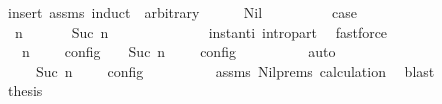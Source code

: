 \begin{isabellebody}
\ {\isacharparenleft}insert\ assms{\isacharcomma}\ induct\ {\isasymPsi}\ arbitrary{\isacharcolon}\ {\isasymGamma}\ {\isasymPhi}{\isacharparenright}\isanewline
\ \ \isamarkupfalse%
\ {\isacharparenleft}Nil\ {\isasymGamma}\ {\isasymPhi}{\isacharparenright}\isanewline
\ \ \ \ \isamarkupfalse%
\ \isamarkupfalse%
\ {\isacharquery}case\isanewline
\ \ \ \ \isamarkupfalse%
\ {\isacharminus}\isanewline
\ \ \ \ \ \ \isamarkupfalse%
\ {\isacartoucheopen}{\isacharparenleft}{\isasymGamma}{\isacharcomma}\ n\ {\isasymturnstile}\ {\isacharbrackleft}{\isacharbrackright}\ {\isasymtriangleright}\ {\isasymPhi}{\isacharparenright}\ {\isasymhookrightarrow}\isactrlesup \ {\isacharparenleft}{\isasymGamma}{\isacharcomma}\ Suc\ n\ {\isasymturnstile}\ {\isasymPhi}\ {\isasymtriangleright}\ {\isacharbrackleft}{\isacharbrackright}{\isacharparenright}{\isacartoucheclose}\isanewline
\ \ \ \ \ \ \ \ \isamarkupfalse%
\ instant{\isacharunderscore}i\ intro{\isacharunderscore}part\ \isamarkupfalse%
\ fastforce\isanewline
\ \ \ \ \ \ \isamarkupfalse%
\ \isamarkupfalse%
\ {\isacartoucheopen}{\isasymlbrakk}\ {\isasymGamma}{\isacharcomma}\ n\ {\isasymturnstile}\ {\isacharbrackleft}{\isacharbrackright}\ {\isasymtriangleright}\ {\isasymPhi}\ {\isasymrbrakk}\isactrlsub c\isactrlsub o\isactrlsub n\isactrlsub f\isactrlsub i\isactrlsub g\ {\isacharequal}\ {\isasymlbrakk}\ {\isasymGamma}{\isacharcomma}\ Suc\ n\ {\isasymturnstile}\ {\isasymPhi}\ {\isasymtriangleright}\ {\isacharbrackleft}{\isacharbrackright}\ {\isasymrbrakk}\isactrlsub c\isactrlsub o\isactrlsub n\isactrlsub f\isactrlsub i\isactrlsub g{\isacartoucheclose}\isanewline
\ \ \ \ \ \ \ \ \isamarkupfalse%
\ auto\isanewline
\ \ \ \ \ \ \isamarkupfalse%
\ \isamarkupfalse%
\ {\isacartoucheopen}{\isasymrho}\ {\isasymin}\ {\isasymlbrakk}\ {\isasymGamma}{\isacharcomma}\ Suc\ n\ {\isasymturnstile}\ {\isasymPhi}\ {\isasymtriangleright}\ {\isacharbrackleft}{\isacharbrackright}\ {\isasymrbrakk}\isactrlsub c\isactrlsub o\isactrlsub n\isactrlsub f\isactrlsub i\isactrlsub g{\isacartoucheclose}\isanewline
\ \ \ \ \ \ \ \ \isamarkupfalse%
\ assms\ Nil{\isachardot}prems\ calculation{\isacharparenleft}{}{\isacharparenright}\ \isamarkupfalse%
\ blast\isanewline
\ \ \ \ \ \ \isamarkupfalse%
\ \isamarkupfalse%
\ {\isacharquery}thesis\ \isamarkupfalse%

\end{isabellebody}
